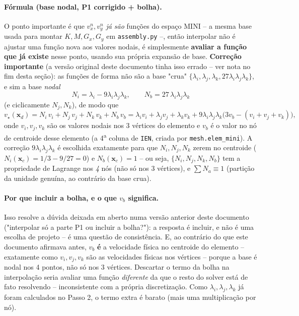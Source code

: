 \documentclass[11pt,a4paper]{article}
\newcommand{\vx}{v_x}
\newcommand{\vy}{v_y}
\begin{document}
\paragraph{Fórmula (base nodal, P1 corrigido + bolha).} O ponto
importante é que $\vx^n,\vy^n$ \emph{já são} funções do espaço MINI --
a mesma base usada para montar $K, M, G_x, G_y$ em
\texttt{assembly.py} --, então interpolar não é ajustar uma função
nova aos valores nodais, é simplesmente \textbf{avaliar a função que
já existe} nesse ponto, usando sua própria expansão de base.
\textbf{Correção importante} (a versão original deste documento tinha
isso errado -- ver nota no fim desta seção): as funções de forma não
são a base "crua" $\{\lambda_i,\lambda_j,\lambda_k,
27\lambda_i\lambda_j\lambda_k\}$, e sim a base \emph{nodal}
\[
N_i = \lambda_i - 9\lambda_i\lambda_j\lambda_k, \qquad
N_b = 27\,\lambda_i\lambda_j\lambda_k
\]
(e ciclicamente $N_j, N_k$), de modo que
\[
v_\star(\mathbf{x}_d) = N_i\,v_i + N_j\,v_j + N_k\,v_k + N_b\,v_b
= \lambda_i v_i+\lambda_j v_j+\lambda_k v_k + 9\lambda_i\lambda_j\lambda_k\big(3v_b-(v_i+v_j+v_k)\big),
\]
onde $v_i,v_j,v_k$ são os valores nodais nos 3 vértices do elemento e
$v_b$ é o valor no nó de centroide desse elemento (a 4\textsuperscript{a}
coluna de \texttt{IEN}, criada por \texttt{mesh.elem\_mini}). A
correção $9\lambda_i\lambda_j\lambda_k$ é escolhida exatamente para
que $N_i, N_j, N_k$ zerem no centroide ($N_i(\mathbf{x}_c)=1/3-9/27=0$)
e $N_b(\mathbf{x}_c)=1$ -- ou seja, $\{N_i,N_j,N_k,N_b\}$ tem a
propriedade de Lagrange nos \emph{4} nós (não só nos 3 vértices), e
$\sum N_a \equiv 1$ (partição da unidade genuína, ao contrário da base
crua).

\paragraph{Por que incluir a bolha, e o que $v_b$ significa.} Isso
resolve a dúvida deixada em aberto numa versão anterior deste
documento ("interpolar só a parte P1 ou incluir a bolha?"): a
resposta é incluir, e não é uma escolha de projeto -- é uma questão
de consistência. E, ao contrário do que este documento afirmava antes,
$v_b$ \textbf{é} a velocidade física no centroide do elemento --
exatamente como $v_i,v_j,v_k$ são as velocidades físicas nos vértices
-- porque a base é nodal nos 4 pontos, não só nos 3 vértices. Descartar
o termo da bolha na interpolação seria avaliar uma função
\emph{diferente} da que o resto do solver está de fato resolvendo --
inconsistente com a própria discretização. Como $\lambda_i,\lambda_j,
\lambda_k$ já foram calculados no Passo 2, o termo extra é barato
(mais uma multiplicação por nó).
\end{document}
